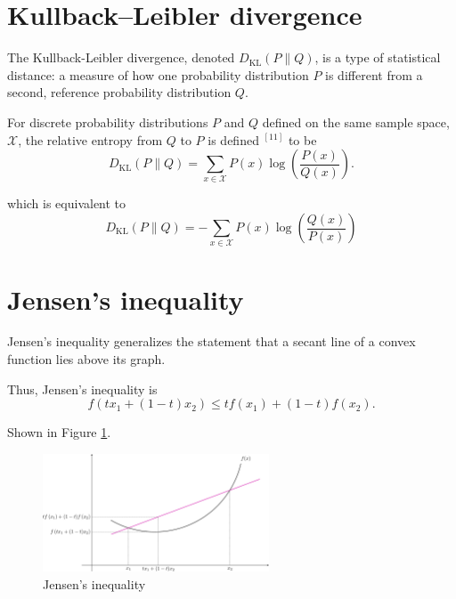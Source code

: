 \section{Kullback–Leibler divergence}
\label{sec:kullb-diverg}


The Kullback-Leibler divergence, denoted $D_{\mathrm{KL}}(P \| Q)$, is a type of statistical distance: a measure of how one probability distribution $P$ is different from a second, reference probability distribution $Q$.


For discrete probability distributions $P$ and $Q$ defined on the same sample space, $\mathcal{X}$, the relative entropy from $Q$ to $P$ is defined ${ }^{[11]}$ to be
\begin{equation}
  \label{eq:27}
  D_{\mathrm{KL}}(P \| Q)=\sum_{x \in \mathcal{X}} P(x) \log \left(\frac{P(x)}{Q(x)}\right) .  
\end{equation}


which is equivalent to
\begin{equation}
  \label{eq:28}
  D_{\mathrm{KL}}(P \| Q)=-\sum_{x \in \mathcal{X}} P(x) \log \left(\frac{Q(x)}{P(x)}\right)  
\end{equation}

\section{Jensen's inequality}
\label{sec:jensens-inequality}

Jensen's inequality generalizes the statement that a secant line of a convex function lies above its graph.

Thus, Jensen's inequality is
\begin{equation}
  \label{eq:40}
f\left(t x_1+(1-t) x_2\right) \leq t f\left(x_1\right)+(1-t) f\left(x_2\right) .  
\end{equation}

Shown in Figure \ref{fig:jenson-equality}.

\begin{figure}[!htp]
  \centering
  \includegraphics[width=0.6\textwidth]{images/jensen-inequality.png}
  \caption{Jensen's inequality}
  \label{fig:jenson-equality}
\end{figure}


